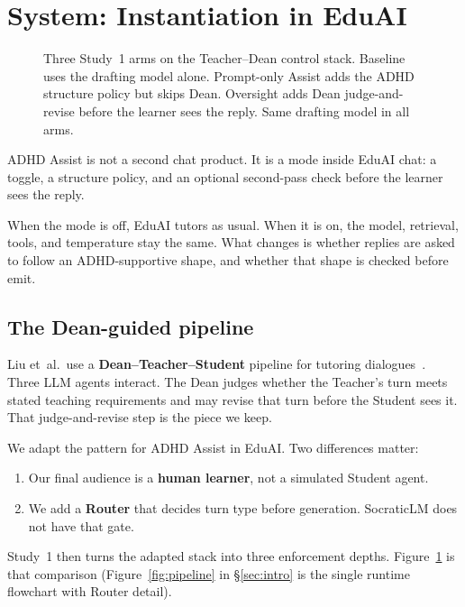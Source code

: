 \section{System: Instantiation in EduAI}
\label{sec:system}

\begin{figure}[t]
\centering

\caption{Three Study~1 arms on the Teacher--Dean control stack.
Baseline uses the drafting model alone. Prompt-only Assist adds the ADHD
structure policy but skips Dean. Oversight adds Dean judge-and-revise before
the learner sees the reply. Same drafting model in all arms.}
\label{fig:threearms}
\end{figure}

ADHD Assist is not a second chat product. It is a mode inside EduAI chat: a
toggle, a structure policy, and an optional second-pass check before the
learner sees the reply.

When the mode is off, EduAI tutors as usual. When it is on, the model,
retrieval, tools, and temperature stay the same. What changes is whether
replies are asked to follow an ADHD-supportive shape, and whether that shape
is checked before emit.

\subsection{The Dean-guided pipeline}
\label{sec:pipeline}

Liu et~al.\ use a \textbf{Dean--Teacher--Student} pipeline for tutoring
dialogues~\cite{liu2024socraticlm}. Three LLM agents interact. The Dean judges
whether the Teacher's turn meets stated teaching requirements and may revise
that turn before the Student sees it. That judge-and-revise step is the piece
we keep.

We adapt the pattern for ADHD Assist in EduAI. Two differences matter:
\begin{enumerate}
  \item Our final audience is a \textbf{human learner}, not a simulated
    Student agent.
  \item We add a \textbf{Router} that decides turn type before generation.
    SocraticLM does not have that gate.
\end{enumerate}

Study~1 then turns the adapted stack into three enforcement depths.
Figure~\ref{fig:threearms} is that comparison (Figure~\ref{fig:pipeline} in
\S\ref{sec:intro} is the single runtime flowchart with Router detail).


